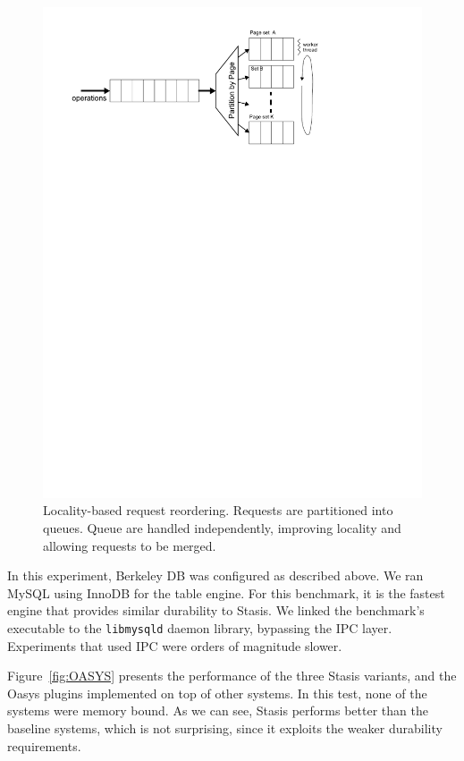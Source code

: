 \documentclass[letterpaper,twocolumn,10pt]{article}
\newcommand{\yad}{Stasis\xspace}
\newcommand{\oasys}{Oasys\xspace}
\newcommand{\graphdbg}[1]{#1}
\begin{document}
\label{sec:logging}
\begin{figure}
\graphdbg{\includegraphics[width=1\columnwidth]{figs/graph-traversal.pdf}}
\caption{\label{fig:multiplexor} Locality-based request reordering.
Requests are partitioned into queues.  Queue are handled
independently, improving locality and allowing requests to be merged.}
\vspace{-12pt}
\end{figure}

In this experiment, Berkeley DB was configured as described above.  We
ran MySQL using InnoDB for the table engine.  For this benchmark, it
is the fastest engine that provides similar durability to \yad. We
linked the benchmark's executable to the {\tt libmysqld} daemon library,
bypassing the IPC layer. Experiments that used IPC were orders of magnitude slower.

Figure~\ref{fig:OASYS} presents the performance of the three \yad
variants, and the \oasys plugins implemented on top of other
systems.  In this test, none of the systems were memory bound.  As
we can see, \yad performs better than the baseline systems, which is
not surprising, since it exploits the weaker durability requirements.
\end{document}
